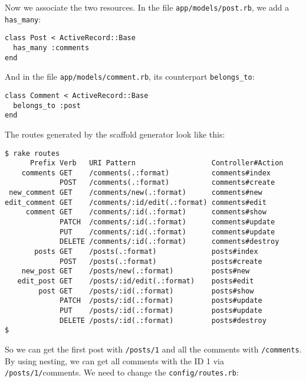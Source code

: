 \documentclass[a4paper]{book}
\begin{document}
Now we associate the two resources. In the file \texttt{app/models/post.rb}, we add a \texttt{has\_many}:

\begin{shaded}\begin{verbatim}
class Post < ActiveRecord::Base
  has_many :comments
end
\end{verbatim}\end{shaded}

And in the file \texttt{app/models/comment.rb}, its counterpart \texttt{belongs\_to}:

\begin{shaded}\begin{verbatim}
class Comment < ActiveRecord::Base
  belongs_to :post
end
\end{verbatim}\end{shaded}

The routes generated by the scaffold generator look like this:

\begin{shaded}\begin{verbatim}
$ rake routes
      Prefix Verb   URI Pattern                  Controller#Action
    comments GET    /comments(.:format)          comments#index
             POST   /comments(.:format)          comments#create
 new_comment GET    /comments/new(.:format)      comments#new
edit_comment GET    /comments/:id/edit(.:format) comments#edit
     comment GET    /comments/:id(.:format)      comments#show
             PATCH  /comments/:id(.:format)      comments#update
             PUT    /comments/:id(.:format)      comments#update
             DELETE /comments/:id(.:format)      comments#destroy
       posts GET    /posts(.:format)             posts#index
             POST   /posts(.:format)             posts#create
    new_post GET    /posts/new(.:format)         posts#new
   edit_post GET    /posts/:id/edit(.:format)    posts#edit
        post GET    /posts/:id(.:format)         posts#show
             PATCH  /posts/:id(.:format)         posts#update
             PUT    /posts/:id(.:format)         posts#update
             DELETE /posts/:id(.:format)         posts#destroy
$
\end{verbatim}\end{shaded}

So we can get the first post with \texttt{/posts/1} and all the comments with \texttt{/comments}. By using nesting, we can get all comments with the ID 1 via \texttt{/posts/1/}comments. We need to change the \texttt{config/routes.rb}:
\end{document}
